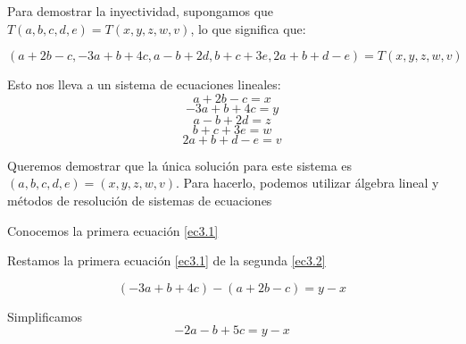 \begin{enumerate}
      Para demostrar la inyectividad, supongamos que $T(a,b,c,d,e) = T(x,y,z,w,v)$, lo que significa que:

      \begin{equation*}
            (a + 2b -c, -3a + b + 4c, a - b + 2d, b + c + 3e, 2a + b + d - e) = T(x,y,z,w,v) 
      \end{equation*}

      Esto nos lleva a un sistema de ecuaciones lineales: 
      \begin{equation}
            a + 2b -c = x \tag{3.1} \label{ec3.1}
      \end{equation}
      \begin{equation*}
            -3a + b + 4c = y \tag{3.2} \label{ec3.2}
      \end{equation*}
      \begin{equation}
            a - b + 2d = z \tag{3.3} \label{ec3.3}
      \end{equation}
      \begin{equation}
            b + c + 3e = w \tag{3.4} \label{ec3.4}
      \end{equation}
      \begin{equation}
            2a + b + d - e = v \tag{3.5} \label{ec3.5} 
      \end{equation}

      Queremos demostrar que la única solución para este sistema es $(a,b,c,d,e) = (x,y,z,w,v)$. Para
      hacerlo, podemos utilizar álgebra lineal y métodos de resolución de sistemas de ecuaciones

      Conocemos la primera ecuación \eqref{ec3.1}
            
      Restamos la primera ecuación \eqref{ec3.1} de la segunda \eqref{ec3.2}

      \begin{equation*}
            (-3a + b + 4c) - (a + 2b -c) = y -x
      \end{equation*}
      
      Simplificamos 
      \begin{equation*}
            -2a - b + 5c = y - x
      \end{equation*}
      

\end{enumerate}
